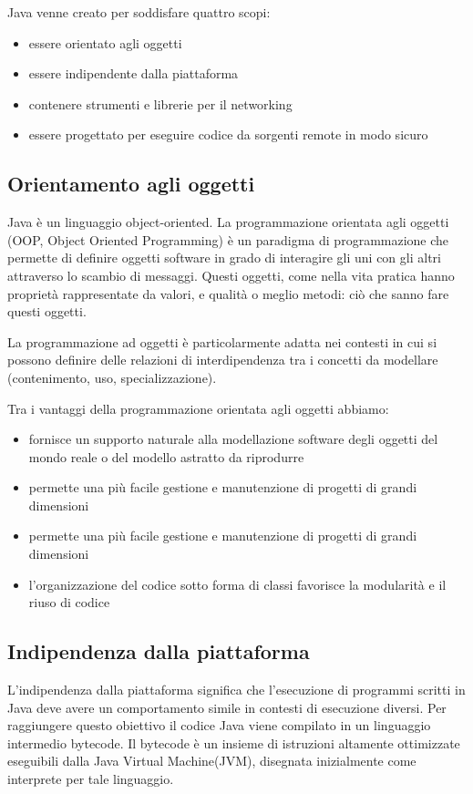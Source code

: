 Java venne creato per soddisfare quattro scopi: 
\begin{itemize}
\item essere orientato agli oggetti
\item essere indipendente dalla piattaforma
\item contenere strumenti e librerie per il networking
\item essere progettato per eseguire codice da sorgenti remote in modo sicuro
\end{itemize}
\subsection*{Orientamento agli oggetti}
Java \`e un linguaggio object-oriented. La programmazione orientata agli oggetti (OOP, Object Oriented Programming) \`e un paradigma di programmazione che permette di definire oggetti software in grado di interagire gli uni con gli altri attraverso lo scambio di messaggi.  Questi oggetti, come nella vita pratica hanno propriet\`a rappresentate da valori, e qualit\`a o meglio metodi: 
ci\`o che sanno fare questi oggetti.

La programmazione ad oggetti \`e particolarmente adatta nei contesti in cui si possono definire delle relazioni di interdipendenza tra i concetti da modellare (contenimento, uso, specializzazione). 

Tra i vantaggi della programmazione orientata agli oggetti abbiamo:
\begin{itemize}
\item fornisce un supporto naturale alla modellazione software degli oggetti del mondo reale o del modello astratto da riprodurre
\item permette una pi\`u facile gestione e manutenzione di progetti di grandi dimensioni
\item permette una pi\`u facile gestione e manutenzione di progetti di grandi dimensioni
\item l'organizzazione del codice sotto forma di classi favorisce la modularit\`a e il riuso di codice
\end{itemize}
\subsection*{Indipendenza dalla piattaforma}
L'indipendenza dalla piattaforma significa che l’esecuzione di programmi scritti  in  Java  deve  avere  un  comportamento  simile 
in contesti di esecuzione diversi. Per raggiungere questo obiettivo il codice Java viene compilato in un linguaggio intermedio bytecode. Il bytecode \`e un insieme di istruzioni altamente ottimizzate eseguibili dalla Java Virtual Machine(JVM), disegnata inizialmente come interprete per tale linguaggio.


